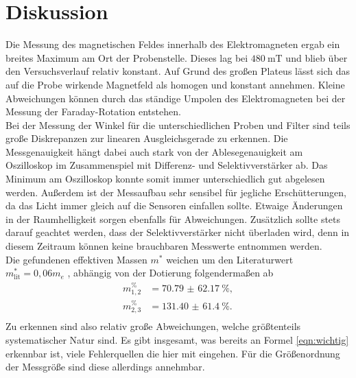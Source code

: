 \section{Diskussion}

Die Messung des magnetischen Feldes innerhalb des Elektromagneten ergab ein breites Maximum am Ort der Probenstelle. Dieses lag bei $\SI{480}{\milli\tesla}$ und blieb über den Versuchsverlauf relativ konstant.
Auf Grund des großen Plateus lässt sich das auf die Probe wirkende Magnetfeld als homogen und konstant annehmen. Kleine Abweichungen können durch das ständige Umpolen des Elektromagneten bei der Messung der Faraday-Rotation entstehen.
\\
\newline
Bei der Messung der Winkel für die unterschiedlichen Proben und Filter sind teils große Diskrepanzen zur linearen Ausgleichsgerade zu erkennen. Die Messgenauigkeit hängt dabei auch stark von der Ablesegenauigkeit am Oszilloskop im Zusammenspiel
mit Differenz- und Selektivverstärker ab. Das Minimum am Oszilloskop konnte somit immer unterschiedlich gut abgelesen werden.
Außerdem ist der Messaufbau sehr sensibel für jegliche Erschütterungen, da das Licht immer gleich auf die Sensoren einfallen sollte.
Etwaige Änderungen in der Raumhelligkeit sorgen ebenfalls für Abweichungen.
Zusätzlich sollte stets darauf geachtet werden, dass der Selektivverstärker nicht überladen wird, denn in diesem Zeitraum können keine brauchbaren Messwerte entnommen werden.
\\
\newline
Die gefundenen effektiven Massen $m^*$ weichen um den Literaturwert $m_{\text{lit}}^{*} = 0,06m_e$ \cite{GaAs}, abhängig von der Dotierung folgendermaßen ab
\begin{align}
m^{\%}_{1{,}2} &= \SI{70.79(6217)}{\percent},\\
m^{\%}_{2{,}3} &= \SI{131.40(6140)}{\percent}.\\
\end{align}
Zu erkennen sind also relativ große Abweichungen, welche größtenteils systematischer Natur sind. Es gibt insgesamt, was bereits an Formel \eqref{eqn:wichtig}
erkennbar ist, viele Fehlerquellen die hier mit eingehen. Für die Größenordnung der Messgröße sind diese allerdings annehmbar.